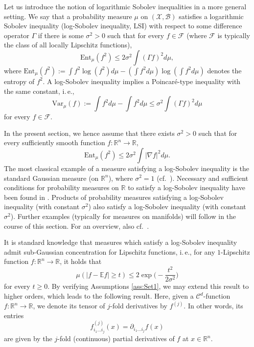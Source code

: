 \documentclass[a4paper,12pt]{amsart}
\numberwithin{equation}{section}
\theoremstyle{remark}
\def\E{{\mathbb E}}
\def\R{{\mathbb R}}
\begin{document}
Let us introduce the notion of logarithmic Sobolev inequalities in a more general setting. We say that a probability measure $\mu$ on $(\mathcal{X},\mathcal{B})$ satisfies a logarithmic Sobolev inequality (log-Sobolev inequality, LSI) with respect to some difference operator $\Gamma$ if there is some $\sigma^2 > 0$ such that for every $f \in \mathcal{F}$ (where $\mathcal{F}$ is typically the class of all locally Lipschitz functions),
\begin{equation}\label{eq:genLSI}
	\mathrm{Ent}_\mu(f^2) \le 2\sigma^2 \int (\Gamma f)^2 d\mu,
\end{equation}
where $\mathrm{Ent}_\mu(f^2) := \int f^2\log(f^2) d\mu - (\int f^2 d\mu) \log(\int f^2 d\mu)$ denotes the entropy of $f^2$. A log-Sobolev inequality implies a Poincar\'{e}-type inequality with the same constant, i.\,e.,
\begin{equation}\label{eq:genPI}
	\mathrm{Var}_\mu(f) := \int f^2 d\mu - \int f^2 d\mu \le \sigma^2 \int (\Gamma f)^2 d\mu
\end{equation}
for every $f \in \mathcal{F}$.

In the present section, we hence assume that there exists $\sigma^2 > 0$ such that for every sufficiently smooth function $f \colon \R^n \to \R$,
\begin{equation}\label{eq:LSI}
	\mathrm{Ent}_\mu(f^2) \le 2\sigma^2 \int |\nabla f|^2 d\mu.
\end{equation}
The most classical example of a measure satisfying a log-Sobolev inequality is the standard Gaussian measure (on $\R^n$), where $\sigma^2=1$ (cf.\ \cite{Gro75}). Necessary and sufficient conditions for probability measures on $\R$ to satisfy a log-Sobolev inequality have been found in \cite{BG99}. Products of probability measures satisfying a log-Sobolev inequality (with constant $\sigma^2$) also satisfy a log-Sobolev inequality (with constant $\sigma^2$). Further examples (typically for measures on manifolds) will follow in the course of this section. For an overview, also cf.\ \cite[Ch.\ 7]{BCG23}.

It is standard knowledge that measures which satisfy a log-Sobolev inequality admit sub-Gaussian concentration for Lipschitz functions, i.\,e., for any $1$-Lipschitz function $f \colon \R^n \to \R$, it holds that
\[
\mu(|f-\E f| \ge t) \le 2\exp\Big(-\frac{t^2}{2\sigma^2}\Big)
\]
for every $t \ge 0$. By verifying Assumptions \ref{ass:Set1}, we may extend this result to higher orders, which leads to the following result. Here, given a $\mathcal{C}^d$-function $f \colon \R^n \to \R$, we denote its tensor of $j$-fold derivatives by $f^{(j)}$. In other words, its entries
\begin{equation*}
	f^{(j)}_{i_1 \ldots i_j}(x) = \partial_{i_1 \ldots i_j} f(x)
\end{equation*}
are given by the $j$-fold (continuous) partial derivatives of $f$ at $x \in \R^n$.
\end{document}

